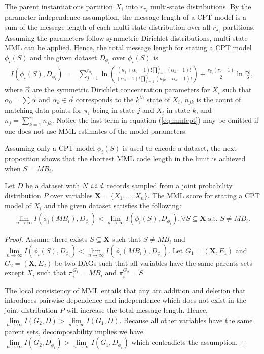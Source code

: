 \documentclass{svmult}
\begin{document}
The parent instantiations partition $X_i$ into $r_{\pi_i}$ multi-state
distributions. By the parameter independence assumption, the message
length of a CPT model is a sum of the message length of each
multi-state distribution over all $r_{\pi_i}$ partitions. Assuming the
parameters follow symmetric Dirichlet distributions, multi-state MML
can be applied. Hence, the total message length for stating a CPT
model $\phi_i(S)$ and the given dataset $D_{\phi_i}$ over $\phi_i(S)$
is
\begin{align}
\label{eq:mmlcpt}
I(\phi_i(S), D_{\phi_i}) = & \sum_{j = 1}^{r_{\pi_i}} \ln \left(\frac{(n_j+\alpha_0-1)! \prod_{k=1}^{r_i} (\alpha_k - 1)!}{(\alpha_0-1)! \prod_{k=1}^{r_i} (n_{jk} + \alpha_k - 1)!} \right) + \frac{r_{\pi_i}(r_i-1)}{2} \ln \frac{\pi e}{6},
\end{align}
where $\vec{\alpha}$ are the symmetric Dirichlet concentration
parameters for $X_i$ such that $\alpha_0 = \sum \vec{\alpha}$ and
$\alpha_k \in \vec{\alpha}$ corresponds to the $k^{th}$ state of
$X_i$, $n_{jk}$ is the count of matching data points for $\pi_i$ being
in state $j$ and $X_i$ in state $k$, and
$n_j = \sum_{k=1}^{r_i} n_{jk}$. Notice the last term in equation
(\ref{eq:mmlcpt}) may be omitted if one does not use MML estimates of
the model parameters.

Assuming only a CPT model $\phi_i(S)$ is used to encode a dataset,
the next proposition shows that the shortest MML code length in the limit  is
achieved when $S = MB_i$.
\begin{proposition}
\label{prop:mmlcpt}
Let $D$ be a dataset with $N$ \textit{i.i.d.} records sampled from a
joint probability distribution $P$ over variables
$\mathbf{X}=\{X_1, \dots, X_n\}$. The MML score for stating a CPT
model of $X_i$ and the given dataset satisfies the following:
\begin{align*}
\lim\limits_{n\rightarrow \infty}I(\phi_i(MB_i), D_{\phi_i}) <
  \lim\limits_{n\rightarrow \infty}I(\phi_i(S), D_{\phi_i}), \forall S
  \subseteq \mathbf{X} \text{ s.t. } S \neq MB_i.
\end{align*}
\end{proposition}

\begin{proof}
  Assume there exists $S \subseteq \mathbf{X}$ such that $S \neq MB_i$ and
  $\lim\limits_{n\rightarrow \infty}I(\phi_i(S), D_{\phi_i}) <
  \lim\limits_{n\rightarrow \infty}I(\phi_i(MB_i), D_{\phi_i})$. Let
  $G_1=(\mathbf{X},E_1)$ and $G_2=(\mathbf{X},E_2)$ be two DAGs such that all variables
  have the same parents sets except $X_i$ such that
  $\pi_i^{G_1} = MB_i$ and $\pi_i^{G_2} = S$.

  The local consistency of MML entails that any arc addition and
  deletion that introduces pairwise dependence and independence which
  does not exist in the joint distribution $P$ will increase the total
  message length. Hence,
  $\lim\limits_{n\rightarrow \infty}I(G_2, D) >
  \lim\limits_{n\rightarrow \infty}I(G_1, D)$. Because all other
  variables have the same parent sets, decomposability implies we have
  $\lim\limits_{n\rightarrow \infty}I(G_2, D_{\phi_i}) >
  \lim\limits_{n\rightarrow \infty}I(G_1, D_{\phi_i})$ which
  contradicts the assumption. \qedwhite
\end{proof}
\end{document}
